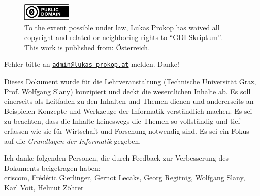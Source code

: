 \begin{titlepage}
  \begin{center}
    \begin{figure}[ht!]
      \begin{center}
        \includegraphics[width=88px,height=33px]{img/cc0.pdf} \\[20pt]%
        To the extent possible under law, Lukas Prokop has waived all copyright and related
        or neighboring rights to ``GDI Skriptum''. \\
        This work is published from: Österreich. 
      \end{center}
    \end{figure}
    \vspace{50pt}
    \noindent Fehler bitte an
    \href{mailto:admin@lukas-prokop.at}{\nolinkurl{admin@lukas-prokop.at}}
    melden. Danke!
    \vspace{50pt}

    Dieses Dokument wurde für die Lehrveranstaltung \courselfocs{}
    (Technische Universität Graz, Prof. Wolfgang Slany) konzipiert
    und deckt die wesentlichen Inhalte ab. Es soll einerseits als
    Leitfaden zu den Inhalten und Themen dienen und andererseits an Beispielen
    Konzepte und Werkzeuge der Informatik verständlich machen. Es sei zu beachten,
    dass die Inhalte keineswegs die Themen so vollständig und tief erfassen
    wie sie für Wirtschaft und Forschung notwendig sind. Es sei ein Fokus
    auf die \emph{Grundlagen der Informatik} gegeben.

    \vspace{50pt}
    Ich danke folgenden Personen, die durch Feedback zur Verbesserung
    des Dokuments beigetragen haben: \\[15pt]
    criscom, Frédéric Gierlinger, Gernot Lecaks, Georg Regitnig, Wolfgang Slany,
    Karl Voit, Helmut Zöhrer
  \end{center}
\end{titlepage}

